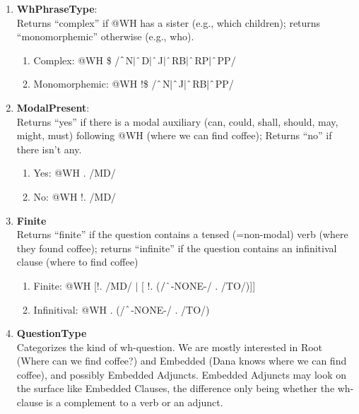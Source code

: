 \begin{enumerate}
    \item \textbf{WhPhraseType}: \\
    Returns ``complex'' if @WH has a sister (e.g., \textsf{which children}); returns ``monomorphemic'' otherwise (e.g., \textsf{who}).
        \begin{enumerate}  
            \item Complex: @WH \$ /$\string^$N$|\string^$D$|\string^$J$|\string^$RB$|\string^$RP$|\string^$PP/
            \item Monomorphemic: @WH !\$ /$\string^$N$|\string^$J$|\string^$RB$|\string^$PP/
        \end{enumerate}

    \item \textbf{ModalPresent}: \\
    Returns ``yes'' if there is a modal auxiliary (\textsf{can}, \textsf{could}, \textsf{shall}, \textsf{should}, \textsf{may}, \textsf{might}, \textsf{must}) following @WH (\textsf{where we can find coffee}); Returns ``no'' if there isn't any.
        \begin{enumerate}
            \item Yes: @WH . /MD/
            \item No: @WH !. /MD/
        \end{enumerate}
    
    \item \textbf{Finite}\\
    Returns ``finite'' if the question contains a tensed (=non-modal) verb (\textsf{where they found coffee}); returns ``infinite'' if the question contains an infinitival clause (\textsf{where to find coffee})\\
        \begin{enumerate}
            \item Finite: @WH [!. /MD/ $|$ [ !. ($/\string^$-NONE-/ . /TO/)]]
            \item Infinitival: @WH . (/$\string^$-NONE-/ . /TO/)
        \end{enumerate}
    
    \item \textbf{QuestionType}\\
    Categorizes the kind of wh-question. We are mostly interested in Root (\textsf{Where can we find coffee?}) and Embedded (Dana knows where we can find coffee), and possibly Embedded Adjuncts. Embedded Adjuncts may look on the surface like Embedded Clauses, the difference only being whether the wh-clause is a complement to a verb or an adjunct. 


\end{enumerate}
